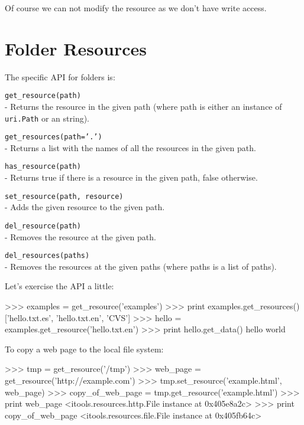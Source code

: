 Of course we can not modify the resource as we don't have write access.


\section{Folder Resources}

The specific API for folders is:

\begin{api}
  {\tt get\_resource(path)}\\
  - Returns the resource in the given path (where path is either an instance
    of {\tt uri.Path} or an string).

  {\tt get\_resources(path='.')}\\
  - Returns a list with the names of all the resources in the given path.

  {\tt has\_resource(path)}\\
  - Returns true if there is a resource in the given path, false otherwise.

  {\tt set\_resource(path, resource)}\\
  - Adds the given resource to the given path.

  {\tt del\_resource(path)}\\
  - Removes the resource at the given path.

  {\tt del\_resources(paths)}\\
  - Removes the resources at the given paths (where paths is a list of paths).
\end{api}

Let's exercise the API a little:

\begin{code}
    >>> examples = get_resource('examples')
    >>> print examples.get_resources()
    ['hello.txt.es', 'hello.txt.en', 'CVS']
    >>> hello = examples.get_resource('hello.txt.en')
    >>> print hello.get_data()
    hello world
\end{code}

To copy a web page to the local file system:

\begin{code}
    >>> tmp = get_resource('/tmp')
    >>> web_page = get_resource('http://example.com')
    >>> tmp.set_resource('example.html', web_page)
    >>> copy_of_web_page = tmp.get_resource('example.html')
    >>> print web_page
    <itools.resources.http.File instance at 0x405e8a2c>
    >>> print copy_of_web_page
    <itools.resources.file.File instance at 0x405fb64c>
\end{code}


